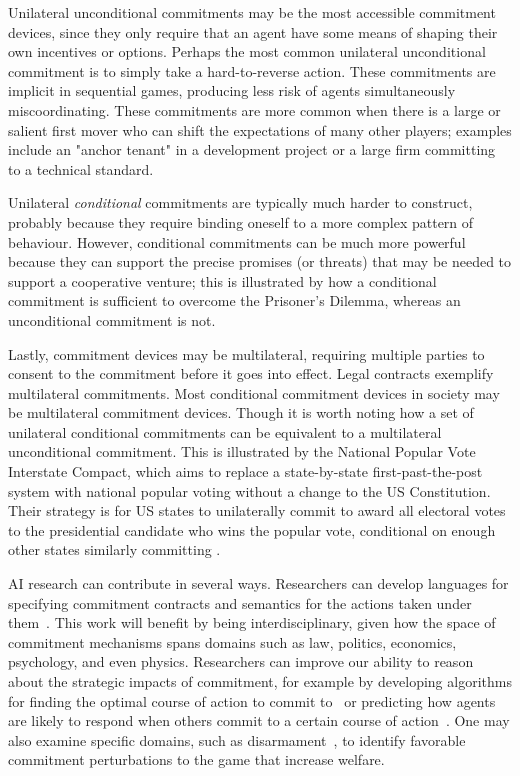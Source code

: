\documentclass[11pt, a4paper, logo, onecolumn, nonumbering]{deepmind}
\begin{document}
Unilateral unconditional commitments may be the most accessible commitment devices, since they only require that an agent have some means of shaping their own incentives or options. %
Perhaps the most common unilateral unconditional commitment is to simply take a hard-to-reverse action. These commitments are implicit in sequential games, producing less risk of agents simultaneously miscoordinating. These commitments are  more common when there is a large or salient first mover who can shift the expectations of many other players; 
examples include an "anchor tenant" in a development project or a large firm committing to a technical standard.

Unilateral \textit{conditional} commitments are typically much harder to construct, probably because they require binding oneself to a more complex pattern of behaviour. 
However, conditional commitments can be much more powerful because they can support the precise promises (or threats) that may be needed to support a cooperative venture; this is illustrated by how a conditional commitment is sufficient to overcome the Prisoner's Dilemma, whereas an unconditional commitment is not. 

Lastly, commitment devices may be multilateral, requiring multiple parties to consent to the commitment before it goes into effect. Legal contracts exemplify multilateral commitments. Most conditional commitment devices in society may be multilateral commitment devices. Though it is worth noting how a set of unilateral conditional commitments can be equivalent to a multilateral unconditional commitment. This is illustrated by the National Popular Vote Interstate Compact, which aims to replace a state-by-state first-past-the-post system with national popular voting without a change to the US Constitution. Their strategy is for US states to unilaterally commit to award all electoral votes to the presidential candidate who wins the popular vote, conditional on enough other states similarly committing  
\cite{natpopvote2020}. %


AI research can contribute in several ways. Researchers can develop languages for specifying commitment contracts and semantics for the actions taken under them~\cite{kosba2016hawk,luu2016making,frantz2016institutions}. This work will benefit by being interdisciplinary, given how the space of commitment mechanisms spans domains  such as law, politics, economics, psychology, and even physics. 
Researchers can improve our ability to reason about the strategic impacts of commitment, for example by developing algorithms for finding the optimal course of action to commit to~\cite{conitzer2006computing} or predicting how agents are likely to respond when others commit to a certain course of action~\cite{korzhyk2011stackelberg,paruchuri2008playing}. One may also examine specific domains, such as disarmament~\cite{deng2017disarmament}, to identify favorable commitment perturbations to the game that increase welfare. 
\end{document}
